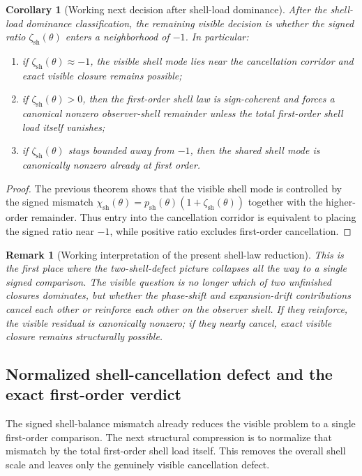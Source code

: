 \documentclass[12pt,a4paper]{article}
\newtheorem{corollary}[theorem]{Corollary}
\newtheorem{remark}[theorem]{Remark}
\begin{document}
\begin{corollary}[Working next decision after shell-load dominance]
After the shell-load dominance classification, the remaining visible decision is whether the signed ratio $\zeta_{\mathrm{sh}}(\theta)$ enters a neighborhood of $-1$. In particular:
\begin{enumerate}[leftmargin=2em,label=(\roman*)]
\item if $\zeta_{\mathrm{sh}}(\theta)\approx -1$, the visible shell mode lies near the cancellation corridor and exact visible closure remains possible;
\item if $\zeta_{\mathrm{sh}}(\theta)>0$, then the first-order shell law is sign-coherent and forces a canonical nonzero observer-shell remainder unless the total first-order shell load itself vanishes;
\item if $\zeta_{\mathrm{sh}}(\theta)$ stays bounded away from $-1$, then the shared shell mode is canonically nonzero already at first order.
\end{enumerate}
\end{corollary}

\begin{proof}
The previous theorem shows that the visible shell mode is controlled by the signed mismatch $\chi_{\mathrm{sh}}(\theta)=p_{\mathrm{sh}}(\theta)(1+\zeta_{\mathrm{sh}}(\theta))$ together with the higher-order remainder. Thus entry into the cancellation corridor is equivalent to placing the signed ratio near $-1$, while positive ratio excludes first-order cancellation.
\end{proof}

\begin{remark}[Working interpretation of the present shell-law reduction]
This is the first place where the two-shell-defect picture collapses all the way to a single signed comparison. The visible question is no longer which of two unfinished closures dominates, but whether the phase-shift and expansion-drift contributions cancel each other or reinforce each other on the observer shell. If they reinforce, the visible residual is canonically nonzero; if they nearly cancel, exact visible closure remains structurally possible.
\end{remark}


\subsection*{Normalized shell-cancellation defect and the exact first-order verdict}
The signed shell-balance mismatch already reduces the visible problem to a single first-order comparison. The next structural compression is to normalize that mismatch by the total first-order shell load itself. This removes the overall shell scale and leaves only the genuinely visible cancellation defect.
\end{document}
